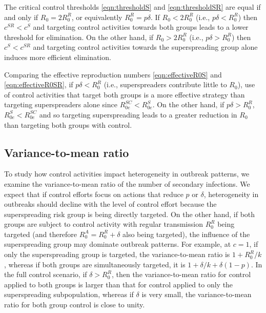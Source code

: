 \documentclass{imammb}
\numberwithin{equation}{section}
\begin{document}
The critical control thresholds  \eqref{eqn:thresholdS} and \eqref{eqn:thresholdSR} are equal if and only if $R_0 = 2 R_0^R$, or equivalently $R_0^R = p \delta$. If $R_0< 2 R_0^R$ (i.e., $p\delta <R_0^R$) then $c^{SR}<c^{S}$ and targeting control activities towards both groups leads to a lower threshold for elimination. On the other hand, if $R_0>2R_0^R$ (i.e., $p \delta > R_0^R$) then $c^{S}< c^{SR}$ and targeting control activities towards the superspreading group  alone induces more efficient elimination. %

Comparing the effective reproduction numbers \eqref{eqn:effectiveR0S} and \eqref{eqn:effectiveR0SR}, if $p \delta < R_0^R$ (i.e., superspreaders contribute little to $R_0$), use of control activities that target both groups is a more effective strategy than targeting superspreaders alone since $R_{0e}^{SC} < R_{0e}^{S}$.   On the other hand, if $p\delta > R_0^R$, $R_{0e}^{S} < R_{0e}^{SC}$ and so targeting superspreading leads to a greater reduction in $R_0$ than targeting both groups with control. 

\subsection{Variance-to-mean ratio}

To study how control activities impact heterogeneity in outbreak patterns, we examine the variance-to-mean ratio of the number of secondary infections. We expect that if control efforts focus on actions that reduce $p$ or $\delta$, heterogeneity in outbreaks should decline with the level of control effort because the superspreading risk group is being directly targeted. On the other hand, if both groups are subject to control activity with regular transmission $R_0^R$ being targeted (and therefore $R_0^A=R_0^R + \delta$ also being targeted), the influence of the superspreading group may dominate outbreak patterns. For example, at $c=1$, if only the superspreading group is targeted, the variance-to-mean ratio is $1+R_0^R/k$, whereas if both groups are simultaneously targeted, it is $1+\delta/k + \delta(1-p)$. In the full control scenario, if $\delta > R_0^R$, then the variance-to-mean ratio for control applied to both groups is larger than that for control applied to only the superspreading subpopulation, whereas if $\delta$ is very small, the variance-to-mean ratio for both group control is close to unity. 

\end{document}
